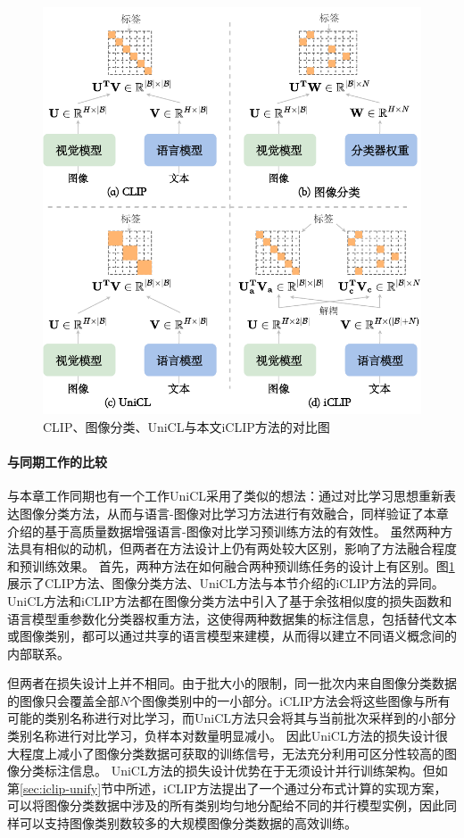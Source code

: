 \begin{figure}
  \centering
  \includegraphics[width=0.8\linewidth]{figures/iclip-unicl.pdf}
  \caption{CLIP、图像分类、UniCL与本文iCLIP方法的对比图}
  \label{fig:iclip-unicl}
\end{figure}

\paragraph{与同期工作的比较} 
与本章工作同期也有一个工作UniCL\cite{unicl}采用了类似的想法：通过对比学习思想重新表达图像分类方法，从而与语言-图像对比学习方法进行有效融合，同样验证了本章介绍的基于高质量数据增强语言-图像对比学习预训练方法的有效性。
虽然两种方法具有相似的动机，但两者在方法设计上仍有两处较大区别，影响了方法融合程度和预训练效果。
首先，两种方法在如何融合两种预训练任务的设计上有区别。图\ref{fig:iclip-unicl}展示了CLIP方法、图像分类方法、UniCL方法与本节介绍的iCLIP方法的异同。
UniCL方法和iCLIP方法都在图像分类方法中引入了基于余弦相似度的损失函数和语言模型重参数化分类器权重方法，这使得两种数据集的标注信息，包括替代文本或图像类别，都可以通过共享的语言模型来建模，从而得以建立不同语义概念间的内部联系。

但两者在损失设计上并不相同。由于批大小的限制，同一批次内来自图像分类数据的图像只会覆盖全部$N$个图像类别中的一小部分。iCLIP方法会将这些图像与所有可能的类别名称进行对比学习，而UniCL方法只会将其与当前批次采样到的小部分类别名称进行对比学习，负样本对数量明显减小。
因此UniCL方法的损失设计很大程度上减小了图像分类数据可获取的训练信号，无法充分利用可区分性较高的图像分类标注信息。
UniCL方法的损失设计优势在于无须设计并行训练架构。但如第\ref{sec:iclip-unify}节中所述，iCLIP方法提出了一个通过分布式计算的实现方案，可以将图像分类数据中涉及的所有类别均匀地分配给不同的并行模型实例，因此同样可以支持图像类别数较多的大规模图像分类数据的高效训练。%

